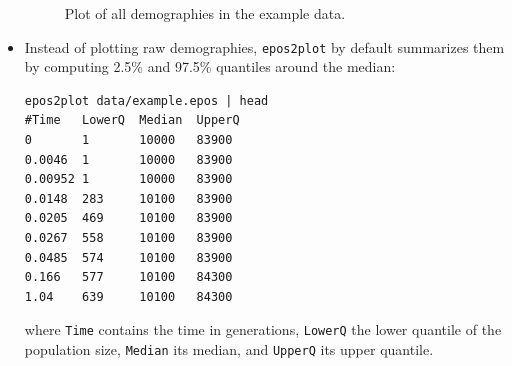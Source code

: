 \documentclass[a4paper]{article}
\newcommand{\ty}{\texttt}
\begin{document}
\begin{itemize}
\begin{figure}
\begin{center}
\end{center}
\caption{Plot of all demographies in the example data.}\label{fig:all}
\end{figure}

\item  Instead of plotting raw demographies, \ty{epos2plot} by default
  summarizes them by computing 2.5\% and 97.5\% quantiles around the
  median:
\begin{verbatim}
epos2plot data/example.epos | head
#Time   LowerQ  Median  UpperQ
0       1       10000   83900
0.0046  1       10000   83900
0.00952 1       10000   83900
0.0148  283     10100   83900
0.0205  469     10100   83900
0.0267  558     10100   83900
0.0485  574     10100   83900
0.166   577     10100   84300
1.04    639     10100   84300
\end{verbatim}
where \ty{Time} contains the time in generations, \ty{LowerQ} the
lower quantile of the population size, \ty{Median} its median, and
\ty{UpperQ} its upper quantile.


\end{itemize}
\end{document}
